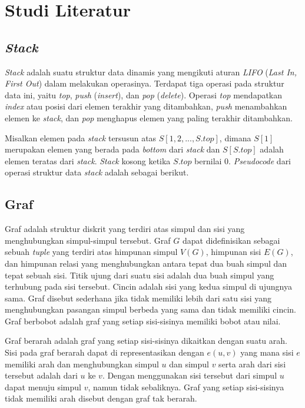 \chapter{Studi Literatur}

\section{\textit{Stack}}

\textit{Stack} adalah suatu struktur data dinamis yang mengikuti aturan \textit{LIFO} (\textit{Last In, First Out}) dalam melakukan operasinya. 
Terdapat tiga operasi pada struktur data ini, yaitu \textit{top}, \textit{push} (\textit{insert}), dan \textit{pop} (\textit{delete}).
Operasi \textit{top} mendapatkan \textit{index} atau posisi dari elemen terakhir yang ditambahkan, \textit{push} 
menambahkan elemen ke \textit{stack}, dan \textit{pop} menghapus elemen yang paling terakhir ditambahkan.

Misalkan elemen pada \textit{stack} tersusun atas $S[1, 2, ..., S.top]$, dimana $S[1]$ merupakan elemen yang berada pada \textit{bottom} dari \textit{stack}
dan $S[S.top]$ adalah elemen teratas dari \textit{stack}. \textit{Stack} kosong ketika $S.top$ bernilai 0. \textit{Pseudocode} dari 
operasi struktur data \textit{stack} adalah sebagai berikut.

\medskip

\medskip

\medskip


\section{Graf}

Graf adalah struktur diskrit yang terdiri atas simpul dan sisi yang menghubungkan simpul-simpul tersebut. Graf $G$ dapat didefinisikan sebagai sebuah \textit{tuple} yang 
terdiri atas himpunan simpul $V(G)$, himpunan sisi $E(G)$, dan himpunan relasi yang menghubungkan antara tepat dua buah simpul dan tepat sebuah sisi. Titik ujung dari suatu sisi 
adalah dua buah simpul yang terhubung pada sisi tersebut. Cincin adalah sisi yang kedua simpul di ujungnya sama. Graf disebut sederhana jika tidak memiliki lebih 
dari satu sisi yang menghubungkan pasangan simpul berbeda yang sama dan tidak memiliki cincin. Graf berbobot adalah graf yang setiap sisi-sisinya memiliki bobot atau nilai.

Graf berarah adalah graf yang setiap sisi-sisinya dikaitkan dengan suatu arah. Sisi pada graf berarah 
dapat di representasikan dengan $e (u, v)$ yang mana sisi $e$ memiliki arah dan menghubungkan 
simpul $u$ dan simpul $v$ serta arah dari sisi tersebut adalah dari $u$ ke $v$. Dengan menggunakan 
sisi tersebut dari simpul $u$ dapat menuju simpul $v$, namun tidak sebaliknya. Graf yang setiap sisi-sisinya 
tidak memiliki arah disebut dengan graf tak berarah.

